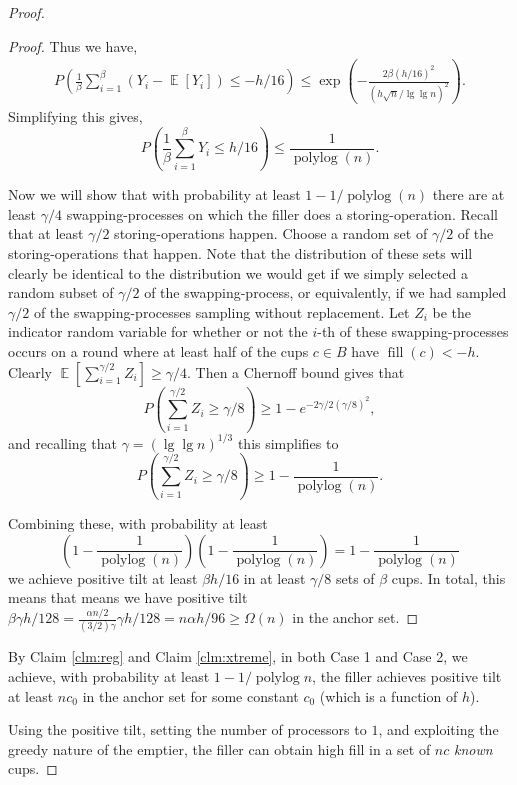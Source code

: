 \documentclass[twocolumn]{article}[10pt]
\DeclareMathOperator{\E}{\mathbb{E}}
\DeclareMathOperator{\polylog}{\text{polylog}}
\DeclareMathOperator{\fil}{\text{fill}}
\begin{document}
\begin{proof}
{\begin{proof}
  Thus we have, 
  \begin{align*}
  P\left(\frac{1}{\beta} \sum_{i=1}^{\beta} (Y_i - \E[Y_i]) \le -h/16 \right) \le
  \exp\left(-\frac{2\beta(h/16)^2}{(h\sqrt{n}/\lg\lg n)^2}\right).
  \end{align*}
  Simplifying this gives,
  $$P\left(\frac{1}{\beta}\sum_{i=1}^{\beta} Y_i \le h/16\right) \le \frac{1}{\polylog(n)}.$$

  Now we will show that with probability at least $1-1/\polylog(n)$ there are
  at least $\gamma/4$ swapping-processes on which the filler does a
  storing-operation.
  Recall that at least $\gamma/2$ storing-operations happen. Choose a random
  set of $\gamma/2$ of the storing-operations that happen. Note that the
  distribution of these sets will clearly be identical to the distribution we
  would get if we simply selected a random subset of $\gamma/2$ of the
  swapping-process, or equivalently, if we had sampled $\gamma/2$ of the
  swapping-processes sampling without replacement. Let $Z_i$ be the indicator
  random variable for whether or not the $i$-th of these swapping-processes occurs on a round
  where at least half of the cups $c \in B$ have $\fil(c) < -h$.
  Clearly $\E\left[\sum_{i=1}^{\gamma/2} Z_i\right] \ge \gamma/4.$ 
  Then a Chernoff bound gives that
  $$P\left(\sum_{i=1}^{\gamma/2} Z_i \ge \gamma/8 \right) \ge 1-e^{-2\gamma/2 (\gamma/8)^2},$$
  and recalling that $\gamma=(\lg\lg n)^{1/3}$ this simplifies to 
  $$P\left(\sum_{i=1}^{\gamma/2} Z_i \ge \gamma/8 \right) \ge 1-\frac{1}{\polylog(n)}.$$

  Combining these, with probability at least
  $$\left(1-\frac{1}{\polylog(n)}\right)\left(1-\frac{1}{\polylog(n)}\right) =
  1-\frac{1}{\polylog(n)}$$ we achieve positive
  tilt at least $\beta h/16$ in at least $\gamma/8$ sets of $\beta$ cups. In
  total, this means that means we have positive tilt $\beta\gamma h/128 =
  \frac{\alpha n/2}{(3/2)\gamma}\gamma h/128 = n\alpha h / 96 \ge \Omega(n)$ in the anchor set.

\end{proof}

  By Claim \ref{clm:reg} and Claim \ref{clm:xtreme}, in both Case 1 and Case 2,
  we achieve, with probability at least $1-1/\polylog n$, the filler achieves
  positive tilt at least $nc_0$ in the anchor set for some constant $c_0$ (which is
  a function of $h$). 

  Using the positive tilt, setting the number of processors to $1$, and
  exploiting the greedy nature of the emptier, the filler can obtain high fill
  in a set of $nc$ \emph{known} cups.

}
\end{proof}
\end{document}
